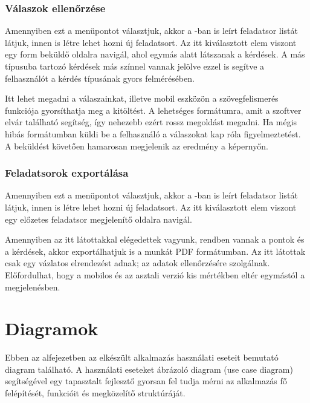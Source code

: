 \subsubsection{Válaszok ellenőrzése}

Amennyiben ezt a menüpontot választjuk, akkor a -ban is leírt feladatsor listát látjuk, innen is létre lehet hozni új feladatsort.
Az itt kiválasztott elem viszont egy form beküldő oldalra navigál, ahol egymás alatt látszanak a kérdések.
A más típusuba tartozó kérdések más színnel vannak jelölve ezzel is segítve a felhasználót a kérdés típusának gyors felmérésében.

Itt lehet megadni a válaszainkat, illetve mobil eszközön a szövegfelismerés funkciója gyorsíthatja meg a kitöltést.
A lehetséges formátumra, amit a szoftver elvár található segítség, így nehezebb ezért rossz megoldást megadni.
Ha mégis hibás formátumban küldi be a felhasználó a válaszokat kap róla figyelmeztetést.
A beküldést követően hamarosan megjelenik az eredmény a képernyőn.

\subsubsection{Feladatsorok exportálása}

Amennyiben ezt a menüpontot választjuk, akkor a -ban is leírt feladatsor listát látjuk, innen is létre lehet hozni új feladatsort.
Az itt kiválasztott elem viszont egy előzetes feladatsor megjelenítő oldalra navigál.

Amennyiben az itt látottakkal elégedettek vagyunk, rendben vannak a pontok és a kérdések, akkor exportálhatjuk is a munkát PDF formátumban.
Az itt látottak csak egy vázlatos elrendezést adnak; az adatok ellenőrzésére szolgálnak.
Előfordulhat, hogy a mobilos és az asztali verzió kis mértékben eltér egymástól a megjelenésben.

\section{Diagramok}
\label{sec:SpecificationDiagrams}

Ebben az alfejezetben az elkészült alkalmazás használati eseteit bemutató diagram található.  
A használati eseteket ábrázoló diagram (use case diagram) segítségével egy tapasztalt fejlesztő gyorsan fel tudja mérni az alkalmazás fő felépítését, funkcióit és megközelítő struktúráját.

